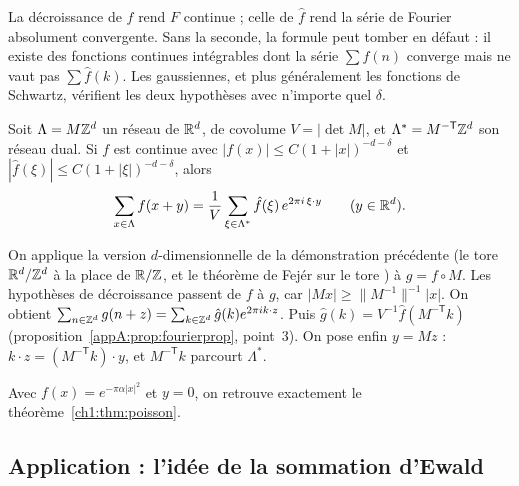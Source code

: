 \begin{remark}
La décroissance de $f$ rend $F$ continue ; celle de $\hat f$ rend la série de Fourier absolument convergente. Sans la
seconde, la formule peut tomber en défaut : il existe des fonctions continues intégrables dont la série $\sum f(n)$
converge mais ne vaut pas $\sum\hat f(k)$. Les gaussiennes, et plus généralement les fonctions de Schwartz, vérifient
les deux hypothèses avec n'importe quel $\delta$.
\end{remark}

\begin{theorem}\label{appA:thm:poissonres}
Soit $\Lambda=M\mathbb{Z}^d$ un réseau de $\mathbb{R}^d$, de covolume $V=|\det M|$, et $\Lambda^*=M^{-\mathsf T}\mathbb{Z}^d$ son réseau dual.
Si $f$ est continue avec $|f(x)|\le C(1+|x|)^{-d-\delta}$ et $|\hat f(\xi)|\le C(1+|\xi|)^{-d-\delta}$, alors
\[\sum_{x\in\Lambda}f(x+y)=\frac1V\sum_{\xi\in\Lambda^*}\hat f(\xi)\,e^{2\pi i\,\xi\cdot y}\qquad(y\in\mathbb{R}^d).\]
\end{theorem}

\begin{humanproof}
On applique la version $d$-dimensionnelle de la démonstration précédente (le tore $\mathbb{R}^d/\mathbb{Z}^d$ à la place de
$\mathbb{R}/\mathbb{Z}$, et le théorème de Fejér sur le tore \tierL) à $g=f\circ M$. Les hypothèses de décroissance passent de $f$ à $g$,
car $|Mx|\ge\|M^{-1}\|^{-1}|x|$. On obtient $\sum_{n\in\mathbb{Z}^d}g(n+z)=\sum_{k\in\mathbb{Z}^d}\hat g(k)e^{2\pi ik\cdot z}$. Puis
$\hat g(k)=V^{-1}\hat f(M^{-\mathsf T}k)$ (proposition~\ref{appA:prop:fourierprop}, point~3). On pose enfin $y=Mz$ :
$k\cdot z=(M^{-\mathsf T}k)\cdot y$, et $M^{-\mathsf T}k$ parcourt $\Lambda^*$.
\end{humanproof}

Avec $f(x)=e^{-\pi\alpha|x|^2}$ et $y=0$, on retrouve exactement le théorème~\ref{ch1:thm:poisson}.

\subsection{Application : l'idée de la sommation d'Ewald}\label{appA:ssec:ewald}

